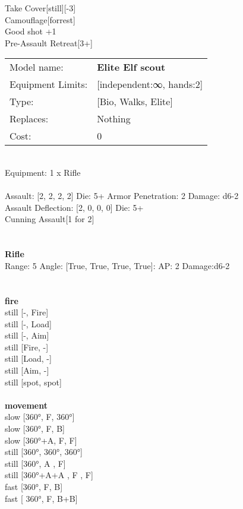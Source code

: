 \noindent Take Cover[still][-3]\\ 
Camouflage[forrest]\\ 
Good shot +1\\ 
Pre-Assault Retreat[3+]\\ 


\noindent
\begin{tabular}{ll}
Model name: &{\bf Elite Elf scout } \\
Equipment Limits: &[independent:∞, hands:2] \\
Type: &[Bio, Walks, Elite] \\
Replaces: &Nothing \\
Cost: & 0\\
\end{tabular}
\ \\
Equipment: 1 x Rifle \\
\ \\
Assault: [2, 2, 2, 2] Die: 5+ Armor Penetration: 2 Damage: d6-2 \\
Assault Deflection: [2, 0, 0, 0] Die: 5+\\
\indent Cunning Assault[1 for 2]\\ 
 
\ \\

\ \\
{\bf Rifle } \\



Range: 5  Angle: [True, True, True, True]: AP: 2 Damage:d6-2 \\




 
\ \\



\ \\ {\bf fire } \\
still [-, Fire] \\
still [-, Load] \\
still [-, Aim] \\
still [Fire, -] \\
still [Load, -] \\
still [Aim, -] \\
still [spot, spot] \\
\ \\ {\bf movement } \\
slow [360°, F, 360°] \\
slow [360°, F, B] \\
slow [360°+A, F, F] \\
still [360°, 360°, 360°] \\
still [360°, A , F] \\
still [360°+A+A , F , F] \\
fast [360°, F, B] \\
fast [ 360°,  F, B+B] \\


